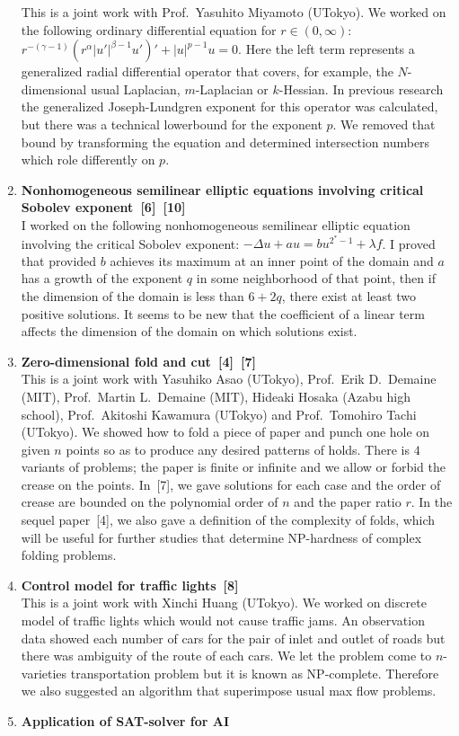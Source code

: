 \begin{enumerate}
  This is a joint work with Prof.~Yasuhito Miyamoto (UTokyo).
  We worked on the following ordinary differential equation for $r
  \in (0, \infty)$:
  $r^{-(\gamma-1)} (r^\alpha \lvert u' \rvert^{\beta -1 } u')'
  + \lvert u \rvert^{p-1} u = 0$.
  Here the left term represents
  a generalized radial differential operator
  that covers, for example, the $N$-dimensional
  usual Laplacian, $m$-Laplacian or $k$-Hessian.
  In previous research
  the generalized Joseph-Lundgren exponent for this operator
  was calculated, but there was a technical lowerbound for
  the exponent $p$.
  We removed that bound by transforming the equation
  and determined intersection numbers
  which role differently on $p$.
  \item {\bf Nonhomogeneous semilinear elliptic equations involving
  critical Sobolev exponent~[6]~[10]} \\
  I worked on the following
  nonhomogeneous semilinear elliptic equation
  involving the critical Sobolev exponent:
  $-\Delta u + a u = b u^{2^* - 1} + \lambda f$.
  I proved that provided
  $b$ achieves its maximum at an inner point of the
  domain and $a$ has a growth of the exponent $q$
  in some neighborhood of that point, then
  if the dimension of the domain is less than $6 + 2q$,
  there exist at least two positive solutions.
  It seems to be new that the coefficient of a linear term affects
  the dimension of the domain on which solutions exist.
  \item {\bf Zero-dimensional fold and cut~[4]~[7]} \\
  This is a joint work with
  Yasuhiko Asao (UTokyo), Prof.~Erik D.~Demaine (MIT),
  Prof.~Martin L.~Demaine (MIT), Hideaki Hosaka (Azabu high school),
  Prof.~Akitoshi Kawamura (UTokyo)
  and Prof.~Tomohiro Tachi (UTokyo).
  We showed how to fold a piece of paper and punch one hole
  on given $n$ points
  so as to produce any desired patterns of holds.
  There is $4$ variants of problems;
  the paper is finite or infinite
  and we allow or forbid the crease on the points.
  In~[7], we gave solutions for each case and the order of crease
  are bounded on the polynomial order of $n$ and the paper ratio
  $r$.
  In the sequel paper~[4], we also gave a definition of
  the complexity of folds, which
  will be useful for further studies that determine
  NP-hardness of complex folding problems.
  \item {\bf Control model for traffic lights~[8]} \\
  This is a joint work with Xinchi Huang (UTokyo).
  We worked on discrete model of traffic lights which would not
  cause traffic jams.
  An observation data showed each number of cars for the pair of
  inlet and outlet of roads but there was ambiguity of
  the route of each cars.
  We let the problem come to
  $n$-varieties transportation problem but it is known as
  NP-complete. Therefore we also suggested an algorithm
  that superimpose usual max flow problems.
  \item {\bf Application of SAT-solver for AI} \\
\end{enumerate}

